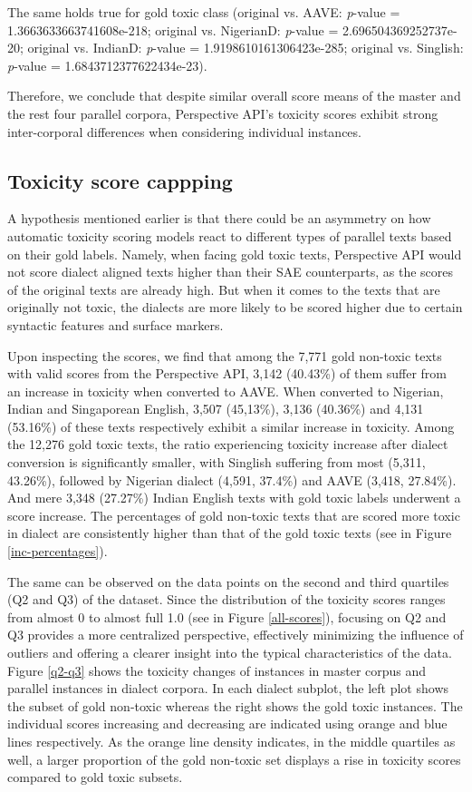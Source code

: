 \documentclass[11pt]{article}
\begin{document}
The same holds true for gold toxic class (original vs. AAVE: \textit{p}-value = 1.3663633663741608e-218; original vs. NigerianD: \textit{p}-value = 2.696504369252737e-20; original vs. IndianD: \textit{p}-value = 1.9198610161306423e-285; original vs. Singlish: \textit{p}-value = 1.6843712377622434e-23).

Therefore, we conclude that despite similar overall score means of the master and the rest four parallel corpora, Perspective API’s toxicity scores exhibit strong inter-corporal differences when considering individual instances.

\subsection{Toxicity score cappping}

A hypothesis mentioned earlier is that there could be an asymmetry on how automatic toxicity scoring models react to different types of parallel texts based on their gold labels. Namely, when facing gold toxic texts, Perspective API would not score dialect aligned texts higher than their SAE counterparts, as the scores of the original texts are already high. But when it comes to the texts that are originally not toxic, the dialects are more likely to be scored higher due to certain syntactic features and surface markers.


Upon inspecting the scores, we find that among the 7,771 gold non-toxic texts with valid scores from the Perspective API, 3,142 (40.43\%) of them suffer from an increase in toxicity when converted to AAVE. When converted to Nigerian, Indian and Singaporean English, 3,507 (45,13\%), 3,136 (40.36\%) and 4,131 (53.16\%) of these texts respectively exhibit a similar increase in toxicity. Among the 12,276 gold toxic texts, the ratio experiencing toxicity increase after dialect conversion is significantly smaller, with Singlish suffering from most (5,311, 43.26\%), followed by Nigerian dialect (4,591, 37.4\%) and AAVE (3,418, 27.84\%). And mere 3,348 (27.27\%) Indian English texts with gold toxic labels underwent a score increase. The percentages of gold non-toxic texts that are scored more toxic in dialect are consistently higher than that of the gold toxic texts (see in Figure \ref{inc-percentages}).

The same can be observed on the data points on the second and third quartiles (Q2 and Q3) of the dataset. Since the distribution of the toxicity scores ranges from almost 0 to almost full 1.0 (see in Figure \ref{all-scores}), focusing on Q2 and Q3 provides a more centralized perspective, effectively minimizing the influence of outliers and offering a clearer insight into the typical characteristics of the data. Figure \ref{q2-q3} shows the toxicity changes of instances in master corpus and parallel instances in dialect corpora. In each dialect subplot, the left plot shows the subset of gold non-toxic whereas the right shows the gold toxic instances. The individual scores increasing and decreasing are indicated using orange and blue lines respectively. As the orange line density indicates, in the middle quartiles as well, a larger proportion of the gold non-toxic set displays a rise in toxicity scores compared to gold toxic subsets.
\end{document}
